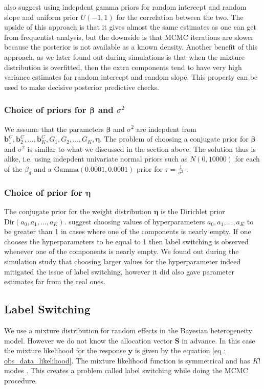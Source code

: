  \citet[pg. 260]{lesaffre_bayesian_2012} also suggest using indepdent gamma priors for random intercept and random slope and uniform prior $U(-1,1)$ for the correlation between the two. The upside of this approach is that it gives almost the same estimates as one can get from frequentist analysis, but the downside is that MCMC iterations are slower because the posterior is not available as a known density. Another benefit of this approach, as we later found out during simulations is that when the mixture distribution is overfitted, then the extra components tend to have very high variance estimates for random intercept and random slope. This property can be used to make decisive posterior predictive checks.

\subsubsection{Choice of priors for $\boldsymbol{\beta}$ and $\sigma^2$}
We assume that the parameters $\boldsymbol{\beta}$ and $\sigma^2$ are indepdent from $\boldsymbol{b}_1^C, \boldsymbol{b}_2^C, ..., \boldsymbol{b}_K^C, G_1, G_2, ..., G_K, \boldsymbol{\eta}$. The problem of choosing a conjugate prior for $\boldsymbol{\beta}$ and $\sigma^2$ is similar to what we discussed in the section above. The solution thus is alike, i.e. using indepdent univariate normal priors such as $N(0, 10000)$ for each of the $\beta_d$ and a $\text{Gamma}(0.0001, 0.0001)$ prior for $\tau = \frac 1 {\sigma^2}$ \citep[chap. 17]{gelman_data_2006}.

\subsubsection{Choice of prior for $\boldsymbol{\eta}$}
The conjugate prior for the weight distribution $\boldsymbol{\eta}$ is the Dirichlet prior $\text{Dir}(a_0, a_1,..., a_K)$. \citet[pg. 105]{fruhwirth-schnatter_finite_2013} suggest choosing values of hyperparameters $a_0, a_1,..., a_K$ to be greater than 1 in cases where one of the components is nearly empty. If one chooses the hyperparameters to be equal to 1 then label switching is observed whenever one of the components is nearly empty. We found out during the simulation study that choosing larger values for the hyperparameter indeed mitigated the issue of label switching, however it did also gave parameter estimates far from the real ones. 

\subsection{Label Switching}
\label{subsec : label_switching_blmm}
We use a mixture distribution for random effects in the Bayesian heterogeneity model. However we do not know the allocation vector $\boldsymbol{S}$ in advance. In this case the mixture likelihood for the response $\boldsymbol{y}$ is given by the equation \ref{eq : obs_data_likelihood}. The mixture likelihood function is symmetrical and has $K!$ modes \citep[pg. 44]{fruhwirth-schnatter_finite_2013}. This creates a problem called label switching while doing the MCMC procedure.\\

